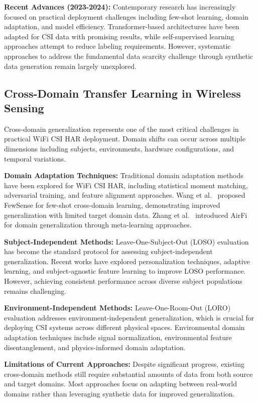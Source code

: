 \textbf{Recent Advances (2023-2024):} Contemporary research has increasingly focused on practical deployment challenges including few-shot learning, domain adaptation, and model efficiency. Transformer-based architectures have been adapted for CSI data with promising results, while self-supervised learning approaches attempt to reduce labeling requirements. However, systematic approaches to address the fundamental data scarcity challenge through synthetic data generation remain largely unexplored.

\subsection{Cross-Domain Transfer Learning in Wireless Sensing}

Cross-domain generalization represents one of the most critical challenges in practical WiFi CSI HAR deployment. Domain shifts can occur across multiple dimensions including subjects, environments, hardware configurations, and temporal variations.

\textbf{Domain Adaptation Techniques:} Traditional domain adaptation methods have been explored for WiFi CSI HAR, including statistical moment matching, adversarial training, and feature alignment approaches. Wang et al.~\cite{fewsense2022} proposed FewSense for few-shot cross-domain learning, demonstrating improved generalization with limited target domain data. Zhang et al.~\cite{airfi2022} introduced AirFi for domain generalization through meta-learning approaches.

\textbf{Subject-Independent Methods:} Leave-One-Subject-Out (LOSO) evaluation has become the standard protocol for assessing subject-independent generalization. Recent works have explored personalization techniques, adaptive learning, and subject-agnostic feature learning to improve LOSO performance. However, achieving consistent performance across diverse subject populations remains challenging.

\textbf{Environment-Independent Methods:} Leave-One-Room-Out (LORO) evaluation addresses environment-independent generalization, which is crucial for deploying CSI systems across different physical spaces. Environmental domain adaptation techniques include signal normalization, environmental feature disentanglement, and physics-informed domain adaptation.

\textbf{Limitations of Current Approaches:} Despite significant progress, existing cross-domain methods still require substantial amounts of data from both source and target domains. Most approaches focus on adapting between real-world domains rather than leveraging synthetic data for improved generalization.

